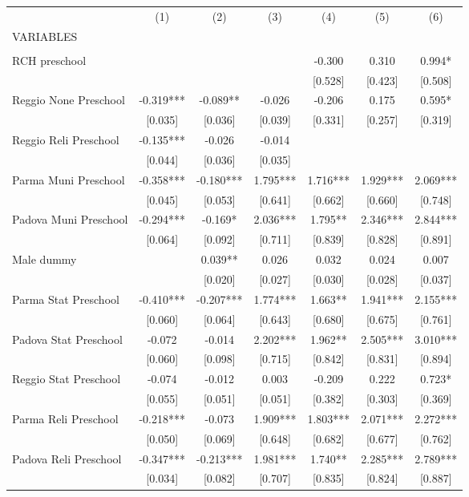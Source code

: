 \begin{tabular}{lcccccc} \hline
 & (1) & (2) & (3) & (4) & (5) & (6) \\
VARIABLES &  &  &  &  &  &  \\ \hline
 &  &  &  &  &  &  \\
RCH preschool &  &  &  & -0.300 & 0.310 & 0.994* \\
 &  &  &  & [0.528] & [0.423] & [0.508] \\
Reggio None Preschool & -0.319*** & -0.089** & -0.026 & -0.206 & 0.175 & 0.595* \\
 & [0.035] & [0.036] & [0.039] & [0.331] & [0.257] & [0.319] \\
Reggio Reli Preschool & -0.135*** & -0.026 & -0.014 &  &  &  \\
 & [0.044] & [0.036] & [0.035] &  &  &  \\
Parma Muni Preschool & -0.358*** & -0.180*** & 1.795*** & 1.716*** & 1.929*** & 2.069*** \\
 & [0.045] & [0.053] & [0.641] & [0.662] & [0.660] & [0.748] \\
Padova Muni Preschool & -0.294*** & -0.169* & 2.036*** & 1.795** & 2.346*** & 2.844*** \\
 & [0.064] & [0.092] & [0.711] & [0.839] & [0.828] & [0.891] \\
Male dummy &  & 0.039** & 0.026 & 0.032 & 0.024 & 0.007 \\
 &  & [0.020] & [0.027] & [0.030] & [0.028] & [0.037] \\
Parma Stat Preschool & -0.410*** & -0.207*** & 1.774*** & 1.663** & 1.941*** & 2.155*** \\
 & [0.060] & [0.064] & [0.643] & [0.680] & [0.675] & [0.761] \\
Padova Stat Preschool & -0.072 & -0.014 & 2.202*** & 1.962** & 2.505*** & 3.010*** \\
 & [0.060] & [0.098] & [0.715] & [0.842] & [0.831] & [0.894] \\
Reggio Stat Preschool & -0.074 & -0.012 & 0.003 & -0.209 & 0.222 & 0.723* \\
 & [0.055] & [0.051] & [0.051] & [0.382] & [0.303] & [0.369] \\
Parma Reli Preschool & -0.218*** & -0.073 & 1.909*** & 1.803*** & 2.071*** & 2.272*** \\
 & [0.050] & [0.069] & [0.648] & [0.682] & [0.677] & [0.762] \\
Padova Reli Preschool & -0.347*** & -0.213*** & 1.981*** & 1.740** & 2.285*** & 2.789*** \\
 & [0.034] & [0.082] & [0.707] & [0.835] & [0.824] & [0.887] \\

\end{tabular}
